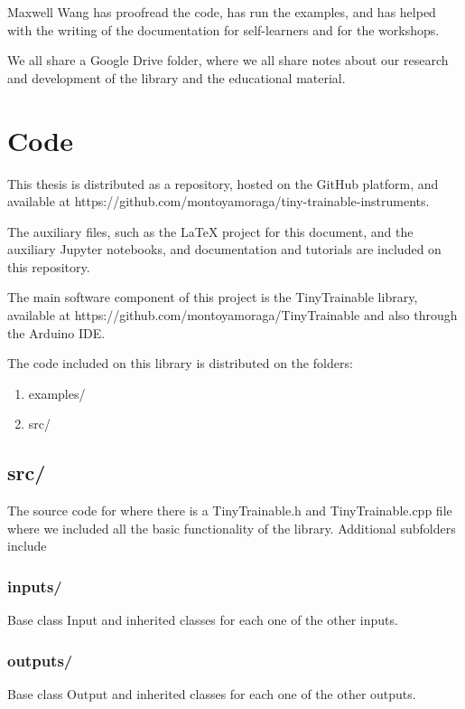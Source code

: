 Maxwell Wang has proofread the code, has run the examples, and has helped with the writing of the documentation for self-learners and for the workshops.

We all share a Google Drive folder, where we all share notes about our research and development of the library and the educational material.

\section{Code}

This thesis is distributed as a repository, hosted on the GitHub platform, and available at https://github.com/montoyamoraga/tiny-trainable-instruments.

The auxiliary files, such as the LaTeX project for this document, and the auxiliary Jupyter notebooks, and documentation and tutorials are included on this repository.

The main software component of this project is the TinyTrainable library, available at https://github.com/montoyamoraga/TinyTrainable and also through the Arduino IDE.

The code included on this library is distributed on the folders:

\begin{enumerate}
  \item examples/
  \item src/
\end{enumerate}

\subsection{src/}

The source code for where there is a TinyTrainable.h and TinyTrainable.cpp file where we included all the basic functionality of the library. Additional subfolders include

\subsubsection{inputs/}

Base class Input and inherited classes for each one of the other inputs.

\subsubsection{outputs/}

Base class Output and inherited classes for each one of the other outputs.

